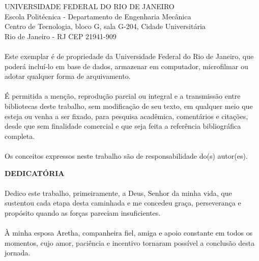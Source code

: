       \vspace{0.5cm}

UNIVERSIDADE FEDERAL DO RIO DE JANEIRO \\
Escola Politécnica - Departamento de Engenharia Mecânica \\
Centro de Tecnologia, bloco G, sala G-204, Cidade Universitária \\ 
Rio de Janeiro - RJ      CEP 21941-909\\
\vspace{0.5cm}
\paragraph{}Este exemplar é de propriedade da Universidade Federal do Rio de Janeiro, que poderá incluí-lo em base de dados, armazenar em computador, microfilmar ou adotar qualquer forma de arquivamento.
\paragraph{}É permitida a menção, reprodução parcial ou integral e a transmissão entre bibliotecas deste trabalho, sem modificação de seu texto, em qualquer meio que esteja ou venha a ser fixado, para pesquisa acadêmica, comentários e citações, desde que sem finalidade comercial e que seja feita a referência bibliográfica completa.
\paragraph{}Os conceitos expressos neste trabalho são de responsabilidade do(s) autor(es).


\pagebreak

\begin{center}
\textbf{DEDICATÓRIA}
\end{center}
      \vspace{0.5cm}

\paragraph{}Dedico este trabalho, primeiramente, a Deus, Senhor da minha vida, que sustentou cada etapa desta caminhada e me concedeu graça, perseverança e propósito quando as forças pareciam insuficientes.

\paragraph{}À minha esposa Aretha, companheira fiel, amiga e apoio constante em todos os momentos, cujo amor, paciência e incentivo tornaram possível a conclusão desta jornada.

